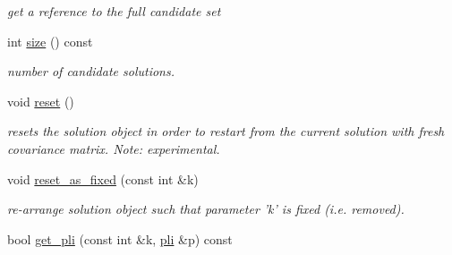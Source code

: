 \begin{DoxyCompactItemize}
\begin{DoxyCompactList}\small\item\em get a reference to the full candidate set \end{DoxyCompactList}\item 
int \hyperlink{classlibcmaes_1_1CMASolutions_a7a7e71c54967613717d2928a38715429}{size} () const 
\begin{DoxyCompactList}\small\item\em number of candidate solutions. \end{DoxyCompactList}\item 
\hypertarget{classlibcmaes_1_1CMASolutions_ab825c9198ee6f7bd9a9b244e567c8624}{void \hyperlink{classlibcmaes_1_1CMASolutions_ab825c9198ee6f7bd9a9b244e567c8624}{reset} ()}\label{classlibcmaes_1_1CMASolutions_ab825c9198ee6f7bd9a9b244e567c8624}

\begin{DoxyCompactList}\small\item\em resets the solution object in order to restart from the current solution with fresh covariance matrix. Note\-: experimental. \end{DoxyCompactList}\item 
void \hyperlink{classlibcmaes_1_1CMASolutions_a036e5542869da8d603388543f8cc9f86}{reset\-\_\-as\-\_\-fixed} (const int \&k)
\begin{DoxyCompactList}\small\item\em re-\/arrange solution object such that parameter 'k' is fixed (i.\-e. removed). \end{DoxyCompactList}\item 
\hypertarget{classlibcmaes_1_1CMASolutions_abdd25e16cb0745e33652d0b3f09a77d1}{bool \hyperlink{classlibcmaes_1_1CMASolutions_abdd25e16cb0745e33652d0b3f09a77d1}{get\-\_\-pli} (const int \&k, \hyperlink{classlibcmaes_1_1pli}{pli} \&p) const }\label{classlibcmaes_1_1CMASolutions_abdd25e16cb0745e33652d0b3f09a77d1}


\end{DoxyCompactItemize}
